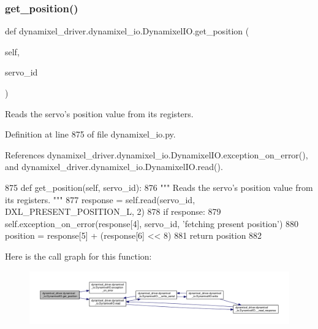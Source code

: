 \subsubsection{\texorpdfstring{get\+\_\+position()}{get\_position()}}
{\footnotesize\ttfamily def dynamixel\+\_\+driver.\+dynamixel\+\_\+io.\+Dynamixel\+I\+O.\+get\+\_\+position (\begin{DoxyParamCaption}\item[{}]{self,  }\item[{}]{servo\+\_\+id }\end{DoxyParamCaption})}

\begin{DoxyVerb}Reads the servo's position value from its registers. \end{DoxyVerb}
 

Definition at line 875 of file dynamixel\+\_\+io.\+py.



References dynamixel\+\_\+driver.\+dynamixel\+\_\+io.\+Dynamixel\+I\+O.\+exception\+\_\+on\+\_\+error(), and dynamixel\+\_\+driver.\+dynamixel\+\_\+io.\+Dynamixel\+I\+O.\+read().


\begin{DoxyCode}
875     \textcolor{keyword}{def }get\_position(self, servo\_id):
876         \textcolor{stringliteral}{""" Reads the servo's position value from its registers. """}
877         response = self.read(servo\_id, DXL\_PRESENT\_POSITION\_L, 2)
878         \textcolor{keywordflow}{if} response:
879             self.exception\_on\_error(response[4], servo\_id, \textcolor{stringliteral}{'fetching present position'})
880         position = response[5] + (response[6] << 8)
881         \textcolor{keywordflow}{return} position
882 
\end{DoxyCode}
Here is the call graph for this function\+:
\nopagebreak
\begin{figure}[H]
\begin{center}
\leavevmode
\includegraphics[width=350pt]{dd/d77/classdynamixel__driver_1_1dynamixel__io_1_1_dynamixel_i_o_ac0f3bb1c05808fb34281f30ba9c43800_cgraph}
\end{center}
\end{figure}
\mbox{\label{classdynamixel__driver_1_1dynamixel__io_1_1_dynamixel_i_o_a23eb8935d71b71c87fac075d8002abc1}} 
